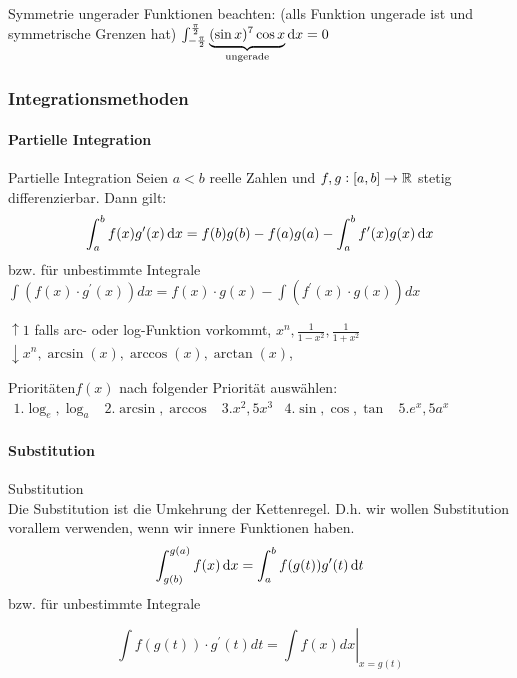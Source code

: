Symmetrie ungerader Funktionen beachten: (alls Funktion ungerade ist und symmetrische Grenzen hat)
$\int_{-\frac{\pi}{2}}^{\frac{\pi}{2}} \underbrace{(\sin x)^7 \cos x}_{\text{ungerade}} \dif x = 0$


\subsubsection{Integrationsmethoden}
\paragraph{Partielle Integration}

\begin{concept}{Partielle Integration}
	Seien $a < b$ reelle Zahlen und $f,g:[a,b] \to \mathbb{R}$ stetig differenzierbar. Dann gilt:
   \begin{equation*}
	   \int_a^b f(x) g'(x) \dif x = f(b) g(b) - f(a) g(a) - \int_a^b f'(x)g(x) \dif x
   \end{equation*}
   bzw. für unbestimmte Integrale\\

   $
   \int\left(f(x) \cdot g^{\prime}(x)\right) d x=f(x) \cdot g(x)-\int\left(f^{\prime}(x) \cdot g(x)\right) d x
   $
\end{concept}
\begin{remark}
   $\uparrow 1$ falls arc- oder log-Funktion vorkommt, $x^{n}, \frac{1}{1-x^{2}}, \frac{1}{1+x^{2}}$\\

   $\downarrow x^{n}, \arcsin (x), \arccos (x), \arctan (x)$,
\end{remark}
\begin{KR}{Prioritäten}$f(x)$ nach folgender Priorität auswählen:\\
   $
   \begin{array}{lllll}
	   1. \log_e, \log_a  & 2. \arcsin, \arccos &  3. x^2, 5x^3 & 4. \sin, \cos, \tan & 5. e^x, 5a^x
   \end{array}
   $
\end{KR}

\paragraph*{Substitution}

\begin{concept}{Substitution}\\
    Die Substitution ist die Umkehrung der Kettenregel. D.h. wir wollen Substitution vorallem verwenden, wenn wir innere Funktionen haben.
    \begin{equation*}
        \int_{g(b)}^{g(a)} f(x) \dif x = \int_{a}^b f(g(t)) g'(t) \dif t
    \end{equation*}
    bzw. für unbestimmte Integrale

    $$
    \int f(g(t)) \cdot g^{\prime}(t) d t=\left.\int f(x) d x\right|_{x=g(t)}
    $$
\end{concept}




